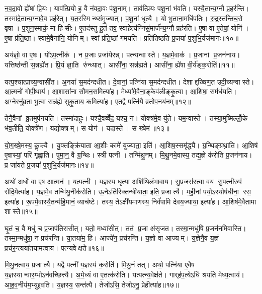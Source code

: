 न॒व॒दा॒वो ह्ये॑षां प्रि॒यः। याव॑त्प्रियो ह॒ वै न॑वदा॒वः प॑शू॒नाम्। ताव॑त्प्रियः पशू॒नां भ॑वति। यस्यै॒तान्य॒ग्नौ प्र॒हर॑न्ति। तस्मा॑दे॒तान्य॒ग्नावे॒व प्रह॑रेत्। य॒त॒रस्मिन्थ्संमृ॒ज्यात्। प॒शू॒नां धृत्यै। यो भू॒ताना॒मधि॑पतिः। रु॒द्रस्त॑न्तिच॒रो वृषा। प॒शून॒स्माकं॒ मा हिसीः। ए॒तद॑स्तु हु॒तं तव॒ स्वाहेत्य॑ग्निसं॒मार्ज॑न्य॒ग्नौ प्रह॑रति। ए॒षा वा ए॒तेषां॒ योनि॑। ए॒षा प्र॑ति॒ष्ठा। स्वामे॒वैना॑नि॒ योनिम्। स्वां प्र॑ति॒ष्ठां ग॑मयति। प्रति॑तिष्ठति प्र॒जया॑ प॒शुभि॒र्यज॑मानः॥१०॥

अय॑ज्ञो॒ वा ए॒षः। यो॑ऽप॒त्नीक॑। न प्र॒जाः प्रजा॑येरन्न्। पत्न्यन्वास्ते। य॒ज्ञमे॒वाक॑। प्र॒जानां प्र॒जन॑नाय। यत्तिष्ठ॑न्ती स॒न्नह्ये॑त। प्रि॒यं ज्ञा॒ति रु॑न्ध्यात्। आसी॑ना॒ सन्न॑ह्यते। आसी॑ना॒ ह्ये॑षा वी॒र्य॑ङ्क॒रोति॑॥११॥

यत्प॒श्चात्प्राच्य॒न्वासी॑त। अ॒नया॑ स॒मद॑न्दधीत। दे॒वानां॒ पत्नि॑या स॒मद॑न्दधीत। देशाद्दख्षिण॒त उदी॒च्यन्वास्ते। आ॒त्मनो॑ गोपी॒थाय॑। आ॒शासा॑ना सौमन॒समित्या॑ह। मेध्या॑मे॒वैना॒ङ्केव॑लीङ्कृ॒त्वा। आ॒शिषा॒ सम॑र्धयति। अ॒ग्नेरनु॑व्रता भू॒त्वा सन्न॑ह्ये सुकृ॒ताय॒ कमित्या॑ह। ए॒तद्वै पत्नि॑यै व्रतोप॒नय॑नम्॥१२॥

तेनै॒वैनां व्र॒तमुप॑नयति। तस्मा॑दाहुः। यश्चै॒वव्वेँद॒ यश्च॒ न। योक्त्र॑मे॒व यु॑ते। यम॒न्वास्ते। तस्या॒मुष्मिल्लोँ॒के भ॑व॒तीति॒ योक्त्रे॑ण। यद्योक्त्रम्। स योग॑। यदास्ते। स ख्षेम॑॥१३॥

यो॒ग॒ख्षे॒मस्य॒ कॢप्त्यै। यु॒क्तङ्क्रि॑याता आ॒शीः कामे॑ युज्याता॒ इति॑। आ॒शिष॒स्समृ॑द्ध्यै। ग्र॒न्थिङ्ग्र॑थ्नाति। आ॒शिष॑ ए॒वास्यां॒ परि॑ गृह्णाति। पुमा॒न्॒ वै ग्र॒न्थिः। स्त्री पत्नी। तन्मि॑थु॒नम्। मि॒थु॒नमे॒वास्य॒ तद्य॒ज्ञे क॑रोति प्र॒जन॑नाय। प्र जा॑यते प्र॒जया॑ प॒शुभि॒र्यज॑मानः॥१४॥

अथो॑ अ॒र्धो वा ए॒ष आ॒त्मन॑। यत्पत्नी। य॒ज्ञस्य॒ धृत्या॒ अशि॑थिलंभावाय। सु॒प्र॒जस॑स्त्वा व॒य सु॒पत्नी॒रुप॑ सेदि॒मेत्या॑ह। य॒ज्ञमे॒व तन्मि॑थु॒नीक॑रोति। ऊ॒नेऽति॑रिक्तन्धीयाता॒ इति॒ प्रजात्यै। म॒ही॒नां पयो॒ऽस्योष॑धीना॒ रस॒ इत्या॑ह। रू॒पमे॒वास्यै॒तन्म॑हि॒मानं॒ व्याच॑ष्टे। तस्य॒ तेऽक्षी॑यमाणस्य॒ निर्व॑पामि देवय॒ज्याया॒ इत्या॑ह। आ॒शिष॑मे॒वैतामा शास्ते॥१५॥\anuvakamend[क॒रोति॑ व्रतोप॒नय॑नं॒ क्षेमो॒ यज॑मानश्शास्ते]

घृ॒तं च॒ वै मधु॑ च प्र॒जाप॑तिरासीत्। यतो॒ मध्वा॑सीत्। तत॑ प्र॒जा अ॑सृजत। तस्मा॒न्मधु॑षि प्र॒जन॑नमिवास्ति। तस्मा॒न्मधु॑षा॒ न प्रच॑रन्ति। या॒तया॑म॒ हि। आज्ये॑न॒ प्रच॑रन्ति। य॒ज्ञो वा आज्यम्। य॒ज्ञेनै॒व य॒ज्ञं प्रच॑र॒न्त्यया॑तयामत्वाय। पत्न्यवेक्षते॥१६॥

मि॒थु॒न॒त्वाय॒ प्रजात्यै। यद्वै पत्नी॑ य॒ज्ञस्य॑ क॒रोति॑। मि॒थु॒नं तत्। अथो॒ पत्नि॑या ए॒वैष य॒ज्ञस्यान्वार॒म्भोऽन॑वच्छित्त्यै। अ॒मे॒ध्यं वा ए॒तत्क॑रोति। यत्पत्न्य॒वेक्ष॑ते। गार्‌ह॑प॒त्येऽधि॑ श्रयति मेध्य॒त्वाय॑। आ॒ह॒व॒नीय॑म॒भ्युद्द्र॑वति। य॒ज्ञस्य॒ सन्त॑त्यै। तेजो॑ऽसि॒ तेजोऽनु॒ प्रेहीत्या॑ह॥१७॥

